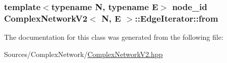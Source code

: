 \hypertarget{class_complex_network_v2_1_1_edge_iterator_a9c12853c790c6168d6439e84f9093e61}{
\subsubsection[{from}]{\setlength{\rightskip}{0pt plus 5cm}template$<$typename N, typename E$>$ {\bf node\+\_\+id} {\bf Complex\+Network\+V2}$<$ N, E $>$\+::Edge\+Iterator\+::from\hspace{0.3cm}{\ttfamily [private]}}}\label{class_complex_network_v2_1_1_edge_iterator_a9c12853c790c6168d6439e84f9093e61}


The documentation for this class was generated from the following file\+:\begin{DoxyCompactItemize}
\item 
Sources/\+Complex\+Network/\hyperlink{_complex_network_v2_8hpp}{Complex\+Network\+V2.\+hpp}\end{DoxyCompactItemize}
